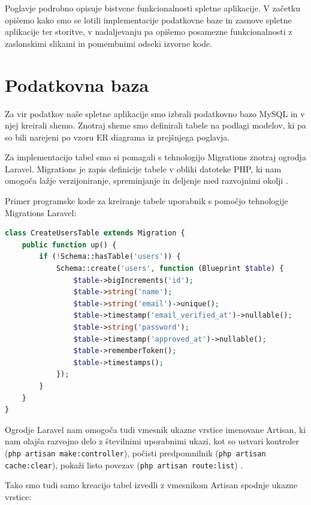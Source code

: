 \documentclass[a4paper, 12pt]{book}
\begin{document}
Poglavje podrobno opisuje bistvene funkcionalnosti spletne aplikacije. V začetku opišemo kako smo se lotili implementacije podatkovne baze in zasnove spletne aplikacije ter storitve, v nadaljevanju pa opišemo posamezne funkcionalnosti z zaslonskimi slikami in pomembnimi odseki izvorne kode.


\section{Podatkovna baza}

Za vir podatkov naše spletne aplikacije smo izbrali podatkovno bazo MySQL in v njej kreirali shemo. Znotraj sheme smo definirali tabele na podlagi modelov, ki pa so bili narejeni po vzoru ER diagrama iz prejšnjega poglavja.
 
Za implementacijo tabel smo si pomagali s tehnologijo Migrations znotraj ogrodja Laravel. Migrations je zapis definicije tabele v obliki datoteke PHP, ki nam omogoča lažje verzijoniranje, spreminjanje in deljenje med razvojnimi okolji \cite{laravel-migrations}.

\clearpage

Primer programske kode za kreiranje tabele uporabnik s pomočjo tehnologije Migrations Laravel:

\begin{lstlisting}[language=PHP, style=mystyle]
class CreateUsersTable extends Migration {
    public function up() {
        if (!Schema::hasTable('users')) {
            Schema::create('users', function (Blueprint $table) {
                $table->bigIncrements('id');
                $table->string('name');
                $table->string('email')->unique();
                $table->timestamp('email_verified_at')->nullable();
                $table->string('password');
                $table->timestamp('approved_at')->nullable();
                $table->rememberToken();
                $table->timestamps();
            });
        }
    }
}
\end{lstlisting}

Ogrodje Laravel nam omogoča tudi vmesnik ukazne vrstice imenovane Artisan, ki nam olajša razvojno delo z številnimi uporabnimi ukazi, kot so ustvari kontroler (\verb=php artisan make:controller=), počisti predpomnilnik (\verb=php artisan cache:clear=), pokaži listo povezav (\verb=php artisan route:list=) \cite{laravel-artisan}.

Tako smo tudi samo kreacijo tabel izvedli z vmesnikom Artisan spodnje ukazne vrstice:
\end{document}
